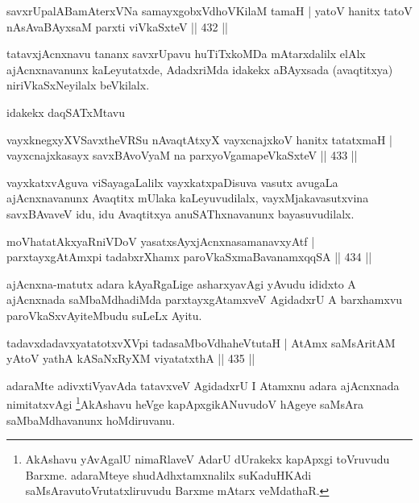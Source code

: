 
\begin{shl}
savxrUpalABamAterxVNa samayxgobxVdhoV\s KilaM tamaH |
yatoV hanitx tatoV nAsAvaBAyxsaM parxti viVkaSxteV \hfill || 432 ||
\end{shl}

\begin{artha}
tatavxjAcnxnavu tananx savxrUpavu huTiTxkoMDa mAtarxdalilx elAlx ajAcnxnavanunx kaLeyutatxde, AdadxriMda idakekx aBAyxsada (avaqtitxya) niriVkaSxNeyilalx beVkilalx.
\end{artha}

\begin{artha}
idakekx daqSATxMtavu
\end{artha}

\begin{shl}
vayxknegxyXVSavxtheVRSu nA\s \s vaqtAtxyX vayxcnajxkoV hanitx tatatxmaH |
vayxcnajxkasayx savxBAvoV\s yaM na parxyoVgamapeVkaSxteV \hfill || 433 ||
\end{shl}

\begin{artha}
vayxkatxvAguva viSayagaLalilx vayxkatxpaDisuva vasutx avugaLa ajAcnxnavanunx Avaqtitx mUlaka kaLeyuvudilalx, vayxMjakavasutxvina savxBAvaveV idu, idu Avaqtitxya anuSAThxnavanunx bayasuvudilalx.
\end{artha}

\begin{shl}
moVhatatAkxyaRniVDoV yasatxsAyxjAcnxnasamanavxyAtf |
parxtayxgAtAmx\s pi tadabxrXhamx paroVkaSxmaBavanamxqqSA \hfill || 434 ||
\end{shl}

\begin{artha}
ajAcnxna-matutx adara kAyaRgaLige asharxyavAgi yAvudu ididxto A ajAcnxnada saMbaMdhadiMda parxtayxgAtamxveV AgidadxrU A barxhamxvu paroVkaSxvAyiteMbudu suLeLx Ayitu.
\end{artha}

\begin{shl}
tadavxdadavxyatatotxvXV\s pi tadasaMboVdhaheVtutaH |
AtAmx saMsAritAM yAtoV yathA kASaNxRyXM viyatatxthA \hfill || 435 ||
\end{shl}

\begin{artha}
adaraMte adivxtiVyavAda tatavxveV AgidadxrU I Atamxnu adara ajAcnxnada nimitatxvAgi \footnote{AkAshavu yAvAgalU nimaRlaveV AdarU dUrakekx kapApxgi toVruvudu Barxme. adaraMteye shudAdhxtamxnalilx suKaduHKAdi saMsAravutoVrutatxliruvudu Barxme mAtarx veMdathaR.}AkAshavu heVge kapApxgikANuvudoV hAgeye saMsAra saMbaMdhavanunx hoMdiruvanu.
\end{artha}

